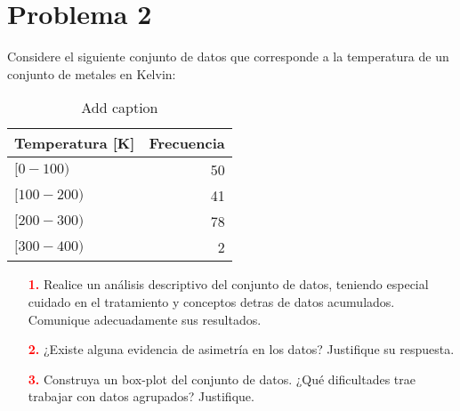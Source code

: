 \documentclass[11pt,letterpaper]{report}
\begin{document}
\section*{Problema 2}
Considere el siguiente conjunto de datos que corresponde a la temperatura de un conjunto de metales en Kelvin:

	
\begin{table}[htbp]
	\centering
	\caption{Add caption}
	\begin{tabular}{|l|r|}
		\toprule
		Temperatura [K] & \multicolumn{1}{l|}{Frecuencia} \\
		\midrule
		$[0-100)$ & 50 \\
		\midrule
		$[100-200)$ & 41 \\
		\midrule
		$[200-300)$ & 78 \\
		\midrule
		$[300-400)$ & 2 \\
		\bottomrule
	\end{tabular}%
	\label{tab:addlabel}%
\end{table}%

\begin{enumerate}
	\item[\textcolor{red}{\bf{1.}}] Realice un análisis descriptivo del conjunto de datos, teniendo especial cuidado en el tratamiento y conceptos detras de datos acumulados. Comunique adecuadamente sus resultados.
	\item[\textcolor{red}{\bf{2.}}] ¿Existe alguna evidencia de asimetría en los datos? Justifique su respuesta.
	\item[\textcolor{red}{\bf{3.}}] Construya un box-plot del conjunto de datos. ¿Qué dificultades trae trabajar con datos agrupados? Justifique.
\end{enumerate}
\newpage
\end{document}
